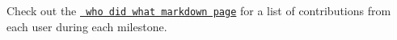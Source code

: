 Check out the \href{https://github.com/Soup-tech/MAMA/blob/main/WhoDidWhat.md}{\texttt{ who did what markdown page}} for a list of contributions from each user during each milestone. 